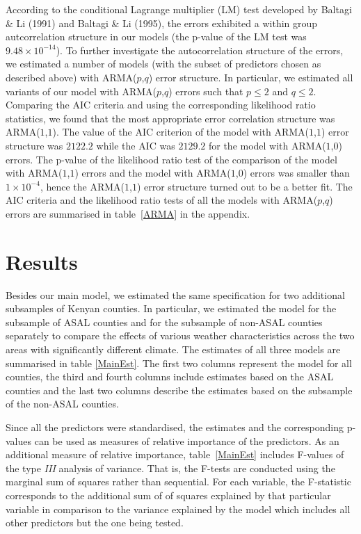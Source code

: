 \documentclass[12pt]{iopart}
\begin{document}
According to the conditional Lagrange multiplier (LM) test developed by Baltagi \& Li (1991) and Baltagi \& Li (1995), the errors exhibited a within group autcorrelation structure in our models (the p-value of the LM test was $9.48\times10^{-14}$). To further investigate the autocorrelation structure of the errors, we estimated a number of models (with the subset of predictors chosen as described above) with ARMA($p$,$q$) error structure. In particular, we estimated all variants of our model with ARMA($p$,$q$) errors such that $p\leq2$ and $q\leq2$. Comparing the AIC criteria and using the corresponding likelihood ratio statistics, we found that the most appropriate error correlation structure was ARMA($1$,$1$). The value of the AIC criterion of the model with ARMA($1$,$1$) error structure was $2122.2$ while the AIC was $2129.2$ for the model with ARMA($1$,$0$) errors.  The p-value of the likelihood ratio test of the comparison of the model with ARMA($1$,$1$) errors and the model with ARMA($1$,$0$) errors was smaller than $1 \times10^{-4}$, hence the ARMA($1$,$1$) error structure turned out to be a better fit. The AIC criteria and the likelihood ratio tests of all the models with ARMA($p$,$q$) errors are summarised in table~\ref{ARMA} in the appendix.



	\section{Results}\label{Results}
	
Besides our main model, we estimated the same specification for two additional subsamples of Kenyan counties. In particular, we estimated the model for the subsample of ASAL counties and for the subsample of non-ASAL counties separately to compare the effects of various weather characteristics across the two areas with significantly different climate. The estimates of all three models are summarised in table \ref{MainEst}. The first two columns represent the model for all counties,  the third and fourth columns include estimates based on the ASAL counties and the last two columns describe the estimates based on the subsample of the non-ASAL counties. 


Since all the predictors were standardised, the estimates and the corresponding p-values can be used as measures of relative importance of the predictors.  As an additional measure of relative importance, table~\ref{MainEst} includes F-values of the type \textit{III} analysis of variance. That is, the F-tests are conducted using the marginal sum of squares rather than sequential. For each variable, the F-statistic corresponds to the additional sum of of squares explained by that particular variable in comparison to the variance explained by the model which includes all other predictors but the one being tested.
\end{document}
